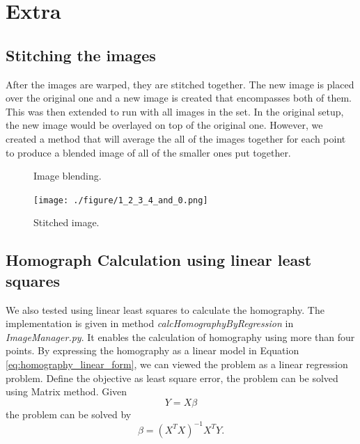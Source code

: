 \documentclass[paper=a4, fontsize=11pt]{scrartcl}
\begin{document}
\section{Extra}

\subsection{Stitching the images}
After the images are warped, they are stitched together.  
The new image is placed over the original one and a new image is created that encompasses both of them.  
This was then extended to run with all images in the set.  
In the original setup, the new image would be overlayed on top of the original one.  
However, we created a method that will average the all of the images together for each point to produce a blended image of all of the smaller ones put together.


\begin{figure}[h]
\centering
{} 
\caption{Image blending.}
\label{fig:blending}
\end{figure}

\begin{figure}[h]
\centering
\texttt{[image: ./figure/1\_2\_3\_4\_and\_0.png]} 
\caption{Stitched image.}
\label{fig:stitched_image}
\end{figure}

\subsection{Homograph Calculation using linear least squares}

We also tested using linear least squares to calculate the homography.
The implementation is given in method \emph{calcHomographyByRegression} in \emph{ImageManager.py}.
It enables the calculation of homography using more than four points.
By expressing the homography as a linear model in Equation \eqref{eq:homography_linear_form},
we can viewed the problem as a linear regression problem. 
Define the objective as least square error, the problem can be solved using Matrix method.
Given
\begin{equation}
Y = X \beta
\end{equation}
the problem can be solved by
\begin{equation}
\beta = (X^{T} X)^{-1} X^{T} Y.
\end{equation}
\end{document}

